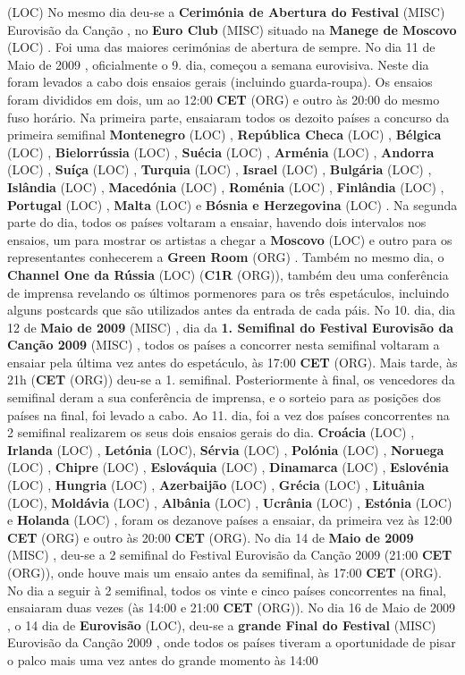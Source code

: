 \documentclass[12pt,a4paper]{article}
\begin{document}
(LOC) No mesmo dia deu-se a \textbf{Cerimónia de Abertura do Festival} (MISC) Eurovisão da Canção , no \textbf{Euro Club} (MISC) situado na \textbf{Manege de Moscovo} (LOC) . Foi uma das maiores cerimónias de abertura de sempre. No dia 11 de Maio de 2009 , oficialmente o 9. dia, começou a semana eurovisiva. Neste dia foram levados a cabo dois ensaios gerais (incluindo guarda-roupa). Os ensaios foram divididos em dois, um ao 12:00 \textbf{CET} (ORG) e outro às 20:00 do mesmo fuso horário. Na primeira parte, ensaiaram todos os dezoito países a concurso da primeira semifinal \textbf{Montenegro} (LOC) , \textbf{República Checa} (LOC) , \textbf{Bélgica} (LOC) , \textbf{Bielorrússia} (LOC) , \textbf{Suécia} (LOC) , \textbf{Arménia} (LOC) , \textbf{Andorra} (LOC) , \textbf{Suíça} (LOC) , \textbf{Turquia} (LOC) , \textbf{Israel} (LOC) , \textbf{Bulgária} (LOC) , \textbf{Islândia} (LOC) , \textbf{Macedónia} (LOC) , \textbf{Roménia} (LOC) , \textbf{Finlândia} (LOC) , \textbf{Portugal} (LOC) , \textbf{Malta} (LOC) e \textbf{Bósnia e Herzegovina} (LOC) . Na segunda parte do dia, todos os países voltaram a ensaiar, havendo dois intervalos nos ensaios, um para mostrar os artistas a chegar a \textbf{Moscovo} (LOC) e outro para os representantes conhecerem a \textbf{Green Room} (ORG) . Também no mesmo dia, o \textbf{Channel One da Rússia} (LOC) (\textbf{C1R} (ORG)), também deu uma conferência de imprensa revelando os últimos pormenores para os três espetáculos, incluindo alguns postcards que são utilizados antes da entrada de cada páis. No 10. dia, dia 12 de \textbf{Maio de 2009} (MISC) , dia da \textbf{1. Semifinal do Festival Eurovisão da Canção 2009} (MISC) , todos os países a concorrer nesta semifinal voltaram a ensaiar pela última vez antes do espetáculo, às 17:00 \textbf{CET} (ORG). Mais tarde, às 21h (\textbf{CET} (ORG)) deu-se a 1. semifinal. Posteriormente à final, os vencedores da semifinal deram a sua conferência de imprensa, e o sorteio para as posições dos países na final, foi levado a cabo. Ao 11. dia, foi a vez dos países concorrentes na 2 semifinal realizarem os seus dois ensaios gerais do dia. \textbf{Croácia} (LOC) , \textbf{Irlanda} (LOC) , \textbf{Letónia} (LOC), \textbf{Sérvia} (LOC) , \textbf{Polónia} (LOC) , \textbf{Noruega} (LOC) , \textbf{Chipre} (LOC) , \textbf{Eslováquia} (LOC) , \textbf{Dinamarca} (LOC) , \textbf{Eslovénia} (LOC) , \textbf{Hungria} (LOC) , \textbf{Azerbaijão} (LOC) , \textbf{Grécia} (LOC) , \textbf{Lituânia} (LOC), \textbf{Moldávia} (LOC) , \textbf{Albânia} (LOC) , \textbf{Ucrânia} (LOC) , \textbf{Estónia} (LOC) e \textbf{Holanda} (LOC) , foram os dezanove países a ensaiar, da primeira vez às 12:00 \textbf{CET} (ORG) e outro às 20:00 \textbf{CET} (ORG). No dia 14 de \textbf{Maio de 2009} (MISC) , deu-se a 2 semifinal do Festival Eurovisão da Canção 2009 (21:00 \textbf{CET} (ORG)), onde houve mais um ensaio antes da semifinal, às 17:00 \textbf{CET} (ORG). No dia a seguir à 2 semifinal, todos os vinte e cinco países concorrentes na final, ensaiaram duas vezes (às 14:00 e 21:00 \textbf{CET} (ORG)). No dia 16 de Maio de 2009 , o 14 dia de \textbf{Eurovisão} (LOC), deu-se a \textbf{grande Final do Festival} (MISC) Eurovisão da Canção 2009 , onde todos os países tiveram a oportunidade de pisar o palco mais uma vez antes do grande momento às 14:00 
\end{document}
